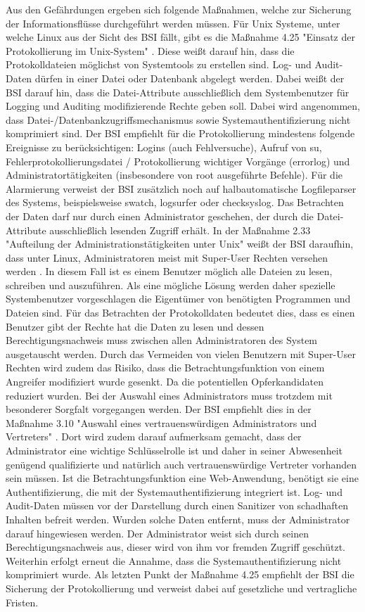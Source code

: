 \documentclass[11pt,a4paper]{report}
\begin{document}
Aus den Gefährdungen ergeben sich folgende Maßnahmen, welche zur Sicherung der Informationsflüsse durchgeführt werden müssen. Für Unix Systeme, unter welche Linux aus der Sicht des BSI fällt, gibt es die Maßnahme 4.25 "Einsatz der Protokollierung im Unix-System" \cite{bsi_m4025}. Diese weißt darauf hin, dass die Protokolldateien möglichst von Systemtools zu erstellen sind. Log- und Audit-Daten dürfen in einer Datei oder Datenbank abgelegt werden. Dabei weißt der BSI darauf hin, dass die Datei-Attribute ausschließlich dem Systembenutzer für Logging und Auditing modifizierende Rechte geben soll. Dabei wird angenommen, dass Datei-/Datenbankzugriffsmechanismus sowie Systemauthentifizierung nicht komprimiert sind. Der BSI empfiehlt für die Protokollierung mindestens folgende Ereignisse zu berücksichtigen: Logins (auch Fehlversuche), Aufruf von su, Fehlerprotokollierungsdatei / Protokollierung wichtiger Vorgänge (errorlog) und Administratortätigkeiten (insbesondere von root ausgeführte Befehle). Für die Alarmierung verweist der BSI zusätzlich noch auf halbautomatische Logfileparser des Systems, beispielsweise swatch, logsurfer oder checksyslog. Das Betrachten der Daten darf nur durch einen Administrator geschehen, der durch die Datei-Attribute ausschließlich lesenden Zugriff erhält. In der Maßnahme 2.33 "Aufteilung der Administrationstätigkeiten unter Unix" weißt der BSI daraufhin, dass unter Linux, Administratoren meist mit Super-User Rechten versehen werden \cite{bsi_m2033}. In diesem Fall ist es einem Benutzer möglich alle Dateien zu lesen, schreiben und auszuführen. Als eine mögliche Lösung werden daher spezielle Systembenutzer vorgeschlagen die Eigentümer von benötigten Programmen und Dateien sind. Für das Betrachten der Protokolldaten bedeutet dies, dass es einen Benutzer gibt der Rechte hat die Daten zu lesen und dessen Berechtigungsnachweis muss zwischen allen Administratoren des System ausgetauscht werden. Durch das Vermeiden von vielen Benutzern mit Super-User Rechten wird zudem das Risiko, dass die Betrachtungsfunktion von einem Angreifer modifiziert wurde gesenkt. Da die potentiellen Opferkandidaten reduziert wurden. Bei der Auswahl eines Administrators muss trotzdem mit besonderer Sorgfalt vorgegangen werden. Der BSI empfiehlt dies in der Maßnahme 3.10 "Auswahl eines vertrauenswürdigen Administrators und Vertreters" \cite{bsi_m3010}. Dort wird zudem darauf aufmerksam gemacht, dass der Administrator eine wichtige Schlüsselrolle ist und daher in seiner Abwesenheit genügend qualifizierte und natürlich auch vertrauenswürdige Vertreter vorhanden sein müssen. Ist die Betrachtungsfunktion eine Web-Anwendung, benötigt sie eine Authentifizierung, die mit der Systemauthentifizierung integriert ist. Log- und Audit-Daten müssen vor der Darstellung durch einen Sanitizer von schadhaften Inhalten befreit werden. Wurden solche Daten entfernt, muss der Administrator darauf hingewiesen werden. Der Administrator weist sich durch seinen Berechtigungsnachweis aus, dieser wird von ihm vor fremden Zugriff geschützt. Weiterhin erfolgt erneut die Annahme, dass die Systemauthentifizierung nicht komprimiert wurde. Als letzten Punkt der Maßnahme 4.25 empfiehlt der BSI die Sicherung der Protokollierung und verweist dabei auf gesetzliche und vertragliche Fristen.
\end{document}
